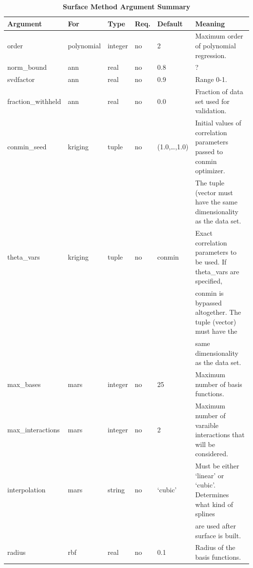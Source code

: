 \documentclass{article}
\begin{document}
\begin{table}
  \centering
  \begin{tabular}{|l|l|l|l|l|l|}
    \hline
    \textbf{Argument} & \textbf{For} & \textbf{Type} & \textbf{Req.} &
    \textbf{Default} & \textbf{Meaning}\\
    \hline
    order & polynomial & integer & no & 2 & Maximum order of
    polynomial regression.\\
    \hline
    norm\_bound & ann & real & no & 0.8 & ?\\
    \hline
    svdfactor & ann & real & no & 0.9 & Range 0-1.\\
    \hline
    fraction\_withheld & ann & real & no & 0.0 & Fraction of data set
    used for validation.\\
    \hline
    conmin\_seed & kriging & tuple & no & (1.0,\ldots,1.0) & Initial
    values of correlation parameters passed to conmin optimizer.\\
    & & & & & The tuple (vector must have the same dimensionality as
    the data set.\\
    \hline
    theta\_vars & kriging & tuple & no & conmin & Exact correlation
    parameters to be used.  If theta\_vars are specified,\\
    & & & & & conmin is bypassed altogether.  The tuple (vector)
    must have the\\
    & & & & & same dimensionality as the data set.\\
    \hline
    max\_bases & mars & integer & no & 25 & Maximum number of basis
    functions.\\
    \hline
    max\_interactions & mars & integer & no & 2 & Maximum number of
    varaible interactions that will be considered.\\
    \hline
    interpolation & mars & string & no & `cubic' & Must be either
    `linear' or `cubic'.  Determines what kind of splines\\
    & & & & & are used after surface is built.\\
    \hline
    radius & rbf & real & no & 0.1 & Radius of the basis
    functions.\\
    \hline
  \end{tabular}
  \caption{\textbf{Surface Method Argument Summary}}
\end{table}
\end{document}
